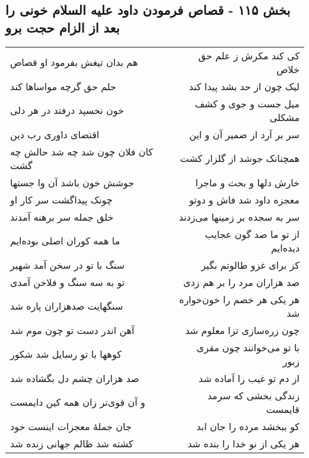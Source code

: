 \begin{center}
\section*{بخش ۱۱۵ - قصاص فرمودن داود علیه السلام خونی را بعد از الزام حجت برو}
\label{sec:sh115}
\begin{longtable}{l p{0.5cm} r}
هم بدان تیغش بفرمود او قصاص
&&
کی کند مکرش ز علم حق خلاص
\\
حلم حق گرچه مواساها کند
&&
لیک چون از حد بشد پیدا کند
\\
خون نخسپد درفتد در هر دلی
&&
میل جست و جوی و کشف مشکلی
\\
اقتضای داوری رب دین
&&
سر بر آرد از ضمیر آن و این
\\
کان فلان چون شد چه شد حالش چه گشت
&&
همچنانک جوشد از گلزار کشت
\\
جوشش خون باشد آن وا جستها
&&
خارش دلها و بحث و ماجرا
\\
چونک پیداگشت سر کار او
&&
معجزه داود شد فاش و دوتو
\\
خلق جمله سر برهنه آمدند
&&
سر به سجده بر زمینها می‌زدند
\\
ما همه کوران اصلی بوده‌ایم
&&
از تو ما صد گون عجایب دیده‌ایم
\\
سنگ با تو در سخن آمد شهیر
&&
کز برای غزو طالوتم بگیر
\\
تو به سه سنگ و فلاخن آمدی
&&
صد هزاران مرد را بر هم زدی
\\
سنگهایت صدهزاران پاره شد
&&
هر یکی هر خصم را خون‌خواره شد
\\
آهن اندر دست تو چون موم شد
&&
چون زره‌سازی ترا معلوم شد
\\
کوهها با تو رسایل شد شکور
&&
با تو می‌خوانند چون مقری زبور
\\
صد هزاران چشم دل بگشاده شد
&&
از دم تو غیب را آماده شد
\\
و آن قوی‌تر زان همه کین دایمست
&&
زندگی بخشی که سرمد قایمست
\\
جان جملهٔ معجزات اینست خود
&&
کو ببخشد مرده را جان ابد
\\
کشته شد ظالم جهانی زنده شد
&&
هر یکی از نو خدا را بنده شد
\\
\end{longtable}
\end{center}
